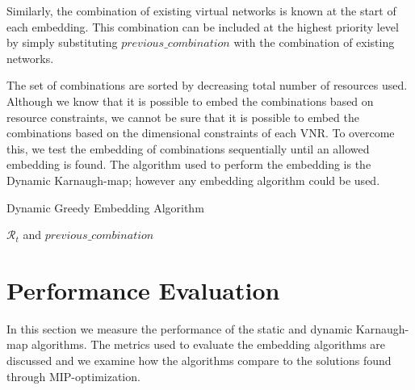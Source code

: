 \documentclass[conference]{IEEEtran}
\begin{document}
Similarly, the combination of existing virtual networks is known at the start of each embedding. This combination can be included at the highest priority level by simply substituting $previous\_combination$ with the  combination of existing networks.



The set of combinations are sorted by decreasing total number of resources used. Although we know that it is possible to embed the combinations based on resource constraints, we cannot be sure that it is possible to embed the combinations based on the dimensional constraints of each VNR. To overcome this, we test the embedding of combinations sequentially until an allowed embedding is found. The algorithm used to perform the embedding is the Dynamic Karnaugh-map; however any embedding algorithm could be used.



\renewcommand{\algorithmicrequire}{\textbf{Input:}}
\renewcommand{\algorithmicensure}{\textbf{Output:}}

\begin{algorithm}
\caption{Dynamic Greedy Embedding Algorithm}
\label{Algorithm:1}
\begin{algorithmic}[1]
 \REQUIRE $\mathcal{R}_t$ and $previous\_combination$
 \ENDIF
 \ENDFOR
 \ENDWHILE
  \ENDFOR

\end{algorithmic}
\end{algorithm}



\section{Performance Evaluation}
\label{sect:evaluation}
In this section we measure the performance of the static and dynamic Karnaugh-map algorithms. The metrics used to evaluate the embedding algorithms are discussed and we examine how the algorithms compare to the solutions found through MIP-optimization.
\end{document}
